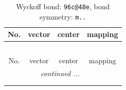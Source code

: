 \documentclass[fleqn,8pt]{jsarticle}
\begin{document}
\renewcommand{\arraystretch}{1.2}
\begin{longtable}{cccc}
\caption{Wyckoff bond: {\tt 96c@48e}, bond symmetry: {\tt m..}}
 \\
 \hline \hline
No. & vector & center & mapping \\ \hline \endfirsthead

\multicolumn{3}{l}{\tablename\ \thetable{}} \\
 \hline \hline
No. & vector & center & mapping \\ \hline \endhead

 \hline \hline
\multicolumn{3}{r}{\footnotesize\it continued ...} \\ \endfoot

 \hline \hline
\multicolumn{3}{r}{} \\ \endlastfoot


\end{longtable}
\end{document}

